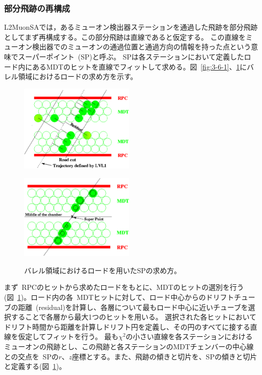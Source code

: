 \subsubsection{部分飛跡の再構成}
L2MuonSAでは，あるミューオン検出器ステーションを通過した飛跡を部分飛跡としてまず再構成する。この部分飛跡は直線であると仮定する。
この直線をミューオン検出器でのミューオンの通過位置と通過方向の情報を持った点という意味でスーパーポイント~(SP)と呼ぶ。
SPは各ステーションにおいて定義したロード内にあるMDTのヒットを直線でフィットして求める。図~\ref{fig:3-6-1}、\ref{fig:3-6-2}にバレル領域におけるロードの求め方を示す。

\begin{figure}[h]
  \begin{minipage}[b]{0.45\linewidth}
      \centering
      \includegraphics[clip, width=5.5cm]{fig/3/mdtResidual.png}
      \label{fig:3-6-1}
  \end{minipage}
    \begin{minipage}[b]{0.5\linewidth}
      \centering
      \includegraphics[clip, width=5.5cm]{fig/3/mdtRoad.png}
      \label{fig:3-6-2}
  \end{minipage}
  \caption{バレル領域におけるロードを用いたSPの求め方\cite{article:onlineMuonReconstruction}。}
\end{figure}

まず~RPCのヒットから求めたロードをもとに、MDTのヒットの選別を行う(図~\ref{fig:3-6-2})。ロード内の各~MDTヒットに対して、ロード中心からのドリフトチューブの距離~(residual)を計算し、各層について最もロード中心に近いチューブを選択することで各層から最大1つのヒットを用いる。
選択された各ヒットにおいてドリフト時間から距離を計算しドリフト円を定義し、その円のすべてに接する直線を仮定してフィットを行う。
最も$\chi^2$の小さい直線を各ステーションにおけるミューオンの飛跡とし、この飛跡と各ステーションのMDTチェンバーの中心線との交点を~SPの$r$、$z$座標とする。また、飛跡の傾きと切片を、SPの傾きと切片と定義する(図~\ref{fig:3-6-2})。



